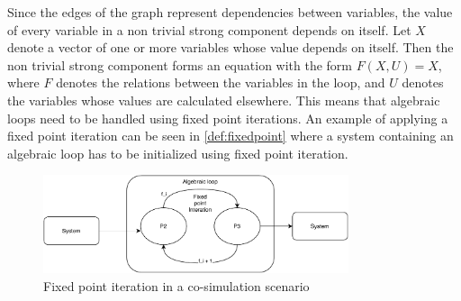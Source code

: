 Since the edges of the graph represent dependencies between variables, the value of every variable in a non trivial strong component depends on itself.
Let $X$ denote a vector of one or more variables whose value depends on itself. Then the non trivial strong component forms an equation with the form $F(X, U) = X$, where $F$ denotes the relations between the variables in the loop, and $U$ denotes the variables whose values are calculated elsewhere.
This means that algebraic loops need to be handled using fixed point iterations\cite{Gomes2018}. 
An example of applying a fixed point iteration can be seen in \cref{def:fixedpoint} where a system containing an algebraic loop has to be initialized using fixed point iteration.

\begin{figure}
    \centering
    \includegraphics[width=0.8\textwidth]{images/fixedpoint.pdf}
    \caption{Fixed point iteration in a co-simulation scenario}
    \label{fig:fixedpont}
\end{figure}


